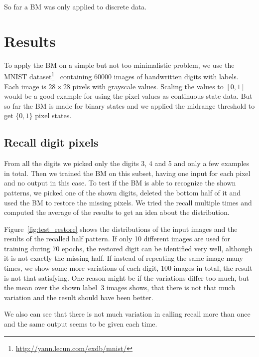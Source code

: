 \documentclass[12pt,twoside]{article}
\theoremstyle{plain}
\theoremstyle{definition}
\theoremstyle{remark}
\begin{document}
So far a BM was only applied to discrete data.


\section{Results}
\label{sec:results}

To apply the BM on a simple but not too minimalistic problem, we use the MNIST dataset\footnote{\url{http://yann.lecun.com/exdb/mnist/}}~\cite{MNIST} containing $60000$ images of handwritten digits with labels. Each image is $28 \times 28$ pixels with grayscale values. Scaling the values to $[0,1]$ would be a good example for using the pixel values as continuous state data. But so far the BM is made for binary states and we applied the midrange threshold to get $\{0, 1\}$ pixel states.


\subsection{Recall digit pixels}

From all the digits we picked only the digits 3, 4 and 5 and only a few examples in total. Then we trained the BM on this subset, having one input for each pixel and no output in this case. To test if the BM is able to recognize the shown patterns, we picked one of the shown digits, deleted the bottom half of it and used the BM to restore the missing pixels. We tried the recall multiple times and computed the average of the results to get an idea about the distribution.

Figure~\ref{fig:test_restore} shows the distributions of the input images and the results of the recalled half pattern. If only 10 different images are used for training during 70 epochs, the restored digit can be identified very well, although it is not exactly the missing half. If instead of repeating the same image many times, we show some more variations of each digit, 100 images in total, the result is not that satisfying. One reason might be if the variations differ too much, but the mean over the shown label~3 images shows, that there is not that much variation and the result should have been better.

We also can see that there is not much variation in calling recall more than once and the same output seems to be given each time. 
\end{document}
